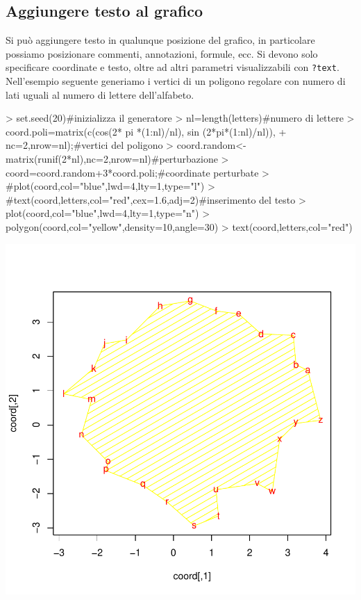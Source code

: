 \documentclass[onecolumn,11pt]{book}
\begin{document}
\subsection{Aggiungere testo al grafico}
Si pu\`o aggiungere testo in qualunque posizione del grafico, in particolare possiamo posizionare commenti, annotazioni, formule, ecc. Si devono solo specificare coordinate e testo, oltre ad altri parametri visualizzabili con \texttt{?text}.
Nell'esempio seguente generiamo i vertici di un poligono regolare con numero di lati uguali al numero di lettere dell'alfabeto.
\begin{Schunk}
\begin{Sinput}
> set.seed(20)#inizializza il generatore
> nl=length(letters)#numero di lettere
> coord.poli=matrix(c(cos(2* pi *(1:nl)/nl), sin (2*pi*(1:nl)/nl)),
+ nc=2,nrow=nl);#vertici del poligono
> coord.random<-matrix(runif(2*nl),nc=2,nrow=nl)#perturbazione
> coord=coord.random+3*coord.poli;#coordinate perturbate
> #plot(coord,col="blue",lwd=4,lty=1,type="l")
> #text(coord,letters,col="red",cex=1.6,adj=2)#inserimento del testo
> plot(coord,col="blue",lwd=4,lty=1,type="n")
> polygon(coord,col="yellow",density=10,angle=30)
> text(coord,letters,col="red")
\end{Sinput}
\end{Schunk}
\includegraphics{statisticaconR-350}
\end{document}
